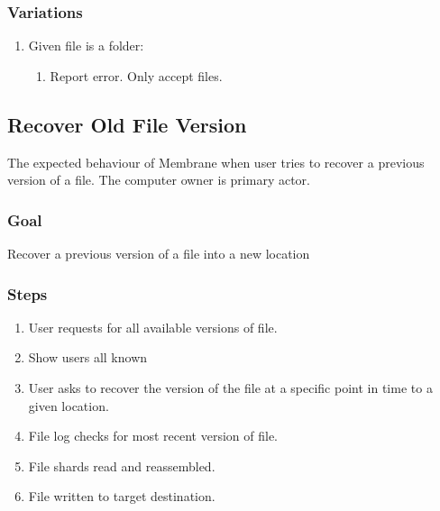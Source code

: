 \documentclass[11pt, a4paper, twoside]{report}
\begin{document}
\subsubsection{Variations}
\begin{enumerate}
  \item Given file is a folder:
	\begin{enumerate}
	  \item Report error. Only accept files.
	\end{enumerate}
\end{enumerate}

\subsection{Recover Old File Version}

The expected behaviour of Membrane when user tries to recover a previous version of a file. The computer owner is primary actor.

\subsubsection{Goal}

Recover a previous version of a file into a new location

\subsubsection{Steps}

\begin{enumerate}
 \item User requests for all available versions of file.
 \item Show users all known 
 \item User asks to recover the version of the file at a specific point in time to a given location.
 \item File log checks for most recent version of file.
 \item File shards read and reassembled.
 \item File written to target destination.
\end{enumerate}
\end{document}
